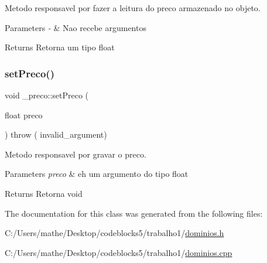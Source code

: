 Metodo responsavel por fazer a leitura do preco armazenado no objeto. 


\begin{DoxyParams}{Parameters}
{\em -\/} & Nao recebe argumentos \\
\hline
\end{DoxyParams}
\begin{DoxyReturn}{Returns}
Retorna um tipo float 
\end{DoxyReturn}
\mbox{\label{class__preco_af32aa1aebf6b4a51e37fa833e02347ce}} 
\subsubsection{\texorpdfstring{setPreco()}{setPreco()}}
{\footnotesize\ttfamily void \+\_\+preco\+::set\+Preco (\begin{DoxyParamCaption}\item[{float}]{preco }\end{DoxyParamCaption}) throw ( invalid\+\_\+argument) }



Metodo responsavel por gravar o preco. 


\begin{DoxyParams}{Parameters}
{\em preco} & eh um argumento do tipo float \\
\hline
\end{DoxyParams}
\begin{DoxyReturn}{Returns}
Retorna void 
\end{DoxyReturn}


The documentation for this class was generated from the following files\+:\begin{DoxyCompactItemize}
\item 
C\+:/\+Users/mathe/\+Desktop/codeblocks5/trabalho1/\mbox{\hyperlink{dominios_8h}{dominios.\+h}}\item 
C\+:/\+Users/mathe/\+Desktop/codeblocks5/trabalho1/\mbox{\hyperlink{dominios_8cpp}{dominios.\+cpp}}\end{DoxyCompactItemize}
